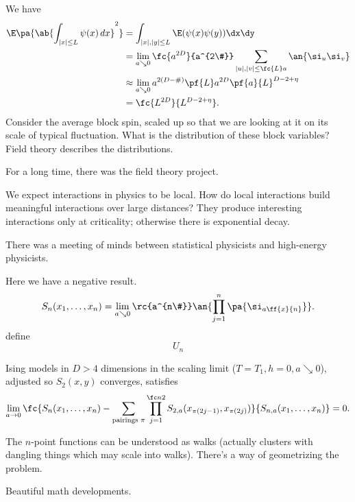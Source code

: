 We have
\begin{align}
\E\pa{\ab{\int_{|x|\le L} \psi(x)\,dx}^2}
& = \int_{|x|,|y|\le L}
\E(\psi(x)\psi(y))\dx\dy \\
&= \lim_{a \searrow 0}\fc{a^{2D}}{a^{2\#}} \sum_{|u|,|v|\le \fc{L}a }\an{\si_u\si_v}\\
&\approx \lim_{a\searrow 0} a^{2(D-\#)}\pf{L}a^{2D} \pf{a}{L}^{D-2+\eta}\\
& = \fc{L^{2D}}{L^{D-2+\eta}}.
%
\end{align}
Consider the average block spin, scaled up so that we are looking at it on its scale of typical fluctuation. What is the distribution of these block variables? Field theory describes the distributions.

For a long time, there was the field theory project.

We expect interactions in physics to be local. How do local interactions build meaningful interactions over large distances? They produce interesting interactions only at criticality; otherwise there is exponential decay. 

There was a meeting of minds between statistical physicists and high-energy physicists.

Here we have a negative result.
\[
S_n(x_1,\ldots, x_n)=\lim_{a\searrow 0} \rc{a^{n\#}} \an{\prod_{j=1}^n \pa{\si_{a\ff{x}{n}}}}.
\]
define
\[
U_n 
\]

\begin{thm}
Ising models in $D>4$ dimensions in the scaling limit ($T=T_1,h=0, a\searrow 0$), adjusted so $S_2(x,y)$ converges, satisfies 
\[
\lim_{a\to 0}
\fc{S_n(x_1,\ldots, x_n)-\sum_{\text{pairings }\pi} \prod_{j=1}^{\fc n2} S_{2,a}(x_{\pi(2j-1)}, x_{\pi(2j)})}{S_{n,a}(x_1,\ldots, x_n)}=0.
\]
\end{thm}


The $n$-point functions can be understood as walks (actually clusters with dangling things which may scale into walks). There's a way of geometrizing the problem. 

Beautiful math developments.


%

